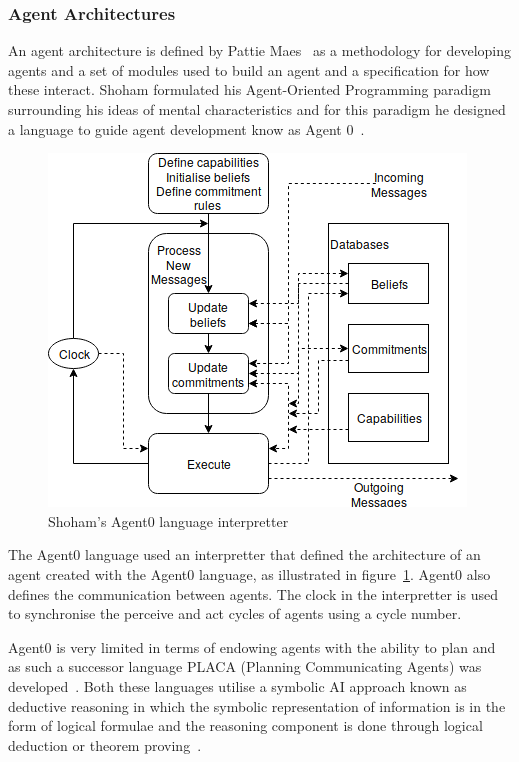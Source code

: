 \documentclass[]{final_report}
\begin{document}
\subsubsection{Agent Architectures}
An agent architecture is defined by Pattie Maes~\cite{Maes:1991:ANA:122344.122367} as a methodology for developing agents and a set of modules used to build an agent and a specification for how these interact. Shoham formulated his Agent-Oriented Programming paradigm~\cite{shoham1993agent} surrounding his ideas of mental characteristics and for this paradigm he designed a language to guide agent development know as Agent 0~\cite{shoham1991agent0}.\par
\begin{figure}
\vspace{-20pt}
\begin{framed}
	\center
	\includegraphics[width=\textwidth]{Agent0Arch.png}
	\caption{Shoham's Agent0 language interpretter~\cite{shoham1991agent0}}
	\label{fig:agent0int}
\end{framed}
\vspace{-20pt}
\end{figure}
The Agent0 language used an interpretter that defined the architecture of an agent created with the Agent0 language, as illustrated in figure~\ref{fig:agent0int}. Agent0 also defines the communication between agents. The clock in the interpretter is used to synchronise the perceive and act cycles of agents using a cycle number.\par  Agent0 is very limited in terms of endowing agents with the ability to plan and as such a successor language PLACA (Planning Communicating Agents) was developed~\cite{thomas1993placa}. Both these languages utilise a symbolic AI approach known as deductive reasoning in which the symbolic representation of information is in the form of logical formulae and the reasoning component is done through logical deduction or theorem proving~\cite{wooldridge2009introduction}.\par 
\end{document}
